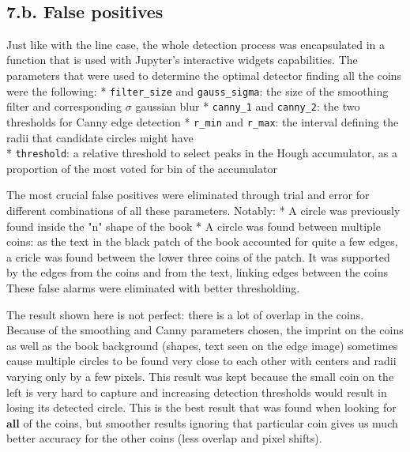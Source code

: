 \documentclass[11pt]{article}
\begin{document}
    \begin{center}
    \end{center}
    { \hspace*{\fill} \\}
    
    \subsection{7.b. False positives}\label{b.-false-positives}

    Just like with the line case, the whole detection process was
encapsulated in a function that is used with Jupyter's interactive
widgets capabilities. The parameters that were used to determine the
optimal detector finding all the coins were the following: *
\texttt{filter\_size} and \texttt{gauss\_sigma}: the size of the
smoothing filter and corresponding \(\sigma\) gaussian blur *
\texttt{canny\_1} and \texttt{canny\_2}: the two thresholds for Canny
edge detection * \texttt{r\_min} and \texttt{r\_max}: the interval
defining the radii that candidate circles might have\\
* \texttt{threshold}: a relative threshold to select peaks in the Hough
accumulator, as a proportion of the most voted for bin of the
accumulator

The most crucial false positives were eliminated through trial and error
for different combinations of all these parameters. Notably: * A circle
was previously found inside the "n" shape of the book * A circle was
found between multiple coins: as the text in the black patch of the book
accounted for quite a few edges, a cricle was found between the lower
three coins of the patch. It was supported by the edges from the coins
and from the text, linking edges between the coins\\
These false alarms were eliminated with better thresholding.

The result shown here is not perfect: there is a lot of overlap in the
coins. Because of the smoothing and Canny parameters chosen, the imprint
on the coins as well as the book background (shapes, text seen on the
edge image) sometimes cause multiple circles to be found very close to
each other with centers and radii varying only by a few pixels. This
result was kept because the small coin on the left is very hard to
capture and increasing detection thresholds would result in losing its
detected circle. This is the best result that was found when looking for
\(\textbf{all}\) of the coins, but smoother results ignoring that
particular coin gives us much better accuracy for the other coins (less
overlap and pixel shifts).
\end{document}
